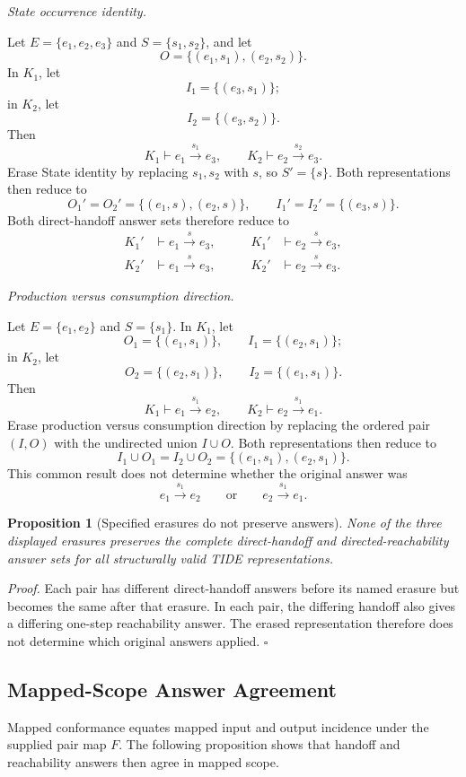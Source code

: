 \documentclass[conference]{IEEEtran}
\theoremstyle{tideproposition}
\newtheorem{proposition}{Proposition}
\newcommand{\direct}[3]{#1\xrightarrow{#2}#3}
\newcommand{\reviewitem}[1]{\par\addvspace{0.22\baselineskip}\noindent\emph{#1.}\ }
\begin{document}
\reviewitem{State occurrence identity}\par\nobreak
Let $E=\{e_1,e_2,e_3\}$ and $S=\{s_1,s_2\}$, and let
\[
O=\{(e_1,s_1),(e_2,s_2)\}.
\]
In $K_1$, let
\[
I_1=\{(e_3,s_1)\};
\]
in $K_2$, let
\[
I_2=\{(e_3,s_2)\}.
\]
Then
\[
K_1\vdash\direct{e_1}{s_1}{e_3},
\qquad
K_2\vdash\direct{e_2}{s_2}{e_3}.
\]
Erase State identity by replacing $s_1,s_2$ with $s$, so $S'=\{s\}$.
Both representations then reduce to
\[
O_1'=O_2'=\{(e_1,s),(e_2,s)\},
\qquad
I_1'=I_2'=\{(e_3,s)\}.
\]
Both direct-handoff answer sets therefore reduce to
\[
\begin{aligned}
K_1'&\vdash\direct{e_1}{s}{e_3},
&\qquad K_1'&\vdash\direct{e_2}{s}{e_3},\\
K_2'&\vdash\direct{e_1}{s}{e_3},
&\qquad K_2'&\vdash\direct{e_2}{s}{e_3}.
\end{aligned}
\]

\reviewitem{Production versus consumption direction}\par\nobreak
Let $E=\{e_1,e_2\}$ and $S=\{s_1\}$. In $K_1$, let
\[
O_1=\{(e_1,s_1)\},
\qquad
I_1=\{(e_2,s_1)\};
\]
in $K_2$, let
\[
O_2=\{(e_2,s_1)\},
\qquad
I_2=\{(e_1,s_1)\}.
\]
Then
\[
K_1\vdash\direct{e_1}{s_1}{e_2},
\qquad
K_2\vdash\direct{e_2}{s_1}{e_1}.
\]
Erase production versus consumption direction by replacing the ordered pair $(I,O)$ with the undirected union $I\cup O$. Both representations then reduce to
\[
I_1\cup O_1
=
I_2\cup O_2
=
\{(e_1,s_1),(e_2,s_1)\}.
\]
This common result does not determine whether the original answer was
\[
\direct{e_1}{s_1}{e_2}
\qquad\text{or}\qquad
\direct{e_2}{s_1}{e_1}.
\]

\begin{proposition}[Specified erasures do not preserve answers]
\label{prop:erasures}
None of the three displayed erasures preserves the complete direct-handoff
and directed-reachability answer sets for all structurally valid TIDE
representations.
\end{proposition}
\noindent\emph{Proof.}
Each pair has different direct-handoff answers before its named erasure but becomes the same after that erasure. In each pair, the differing handoff also gives a differing one-step reachability answer. The erased representation therefore does not determine which original answers applied. \hfill$\square$

\subsection{Mapped-Scope Answer Agreement}
Mapped conformance equates mapped input and output incidence under the supplied pair map $F$. The following proposition shows that handoff and reachability answers then agree in mapped scope.
\end{document}

